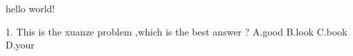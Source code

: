 \documentclass[a4paper,fontset = windowsnew]{ctexbook}
\begin{document}
hello world!

\begin{xuanze}
   1. This is the xuanze problem ,which is the  best answer ?
   A.good
   B.look
   C.book
   D.your

\end{xuanze}
\end{document}
